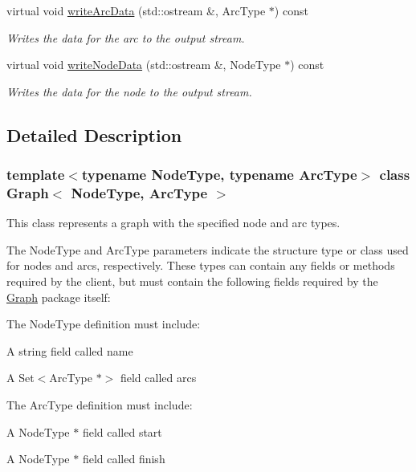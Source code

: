 \begin{DoxyCompactItemize}
virtual void \mbox{\hyperlink{classGraph_ac9ab61a83ff4792f63e9e110b534cdfd}{write\+Arc\+Data}} (std\+::ostream \&, Arc\+Type $\ast$) const
\begin{DoxyCompactList}\small\item\em Writes the data for the arc to the output stream. \end{DoxyCompactList}\item 
virtual void \mbox{\hyperlink{classGraph_ac0db5231476c8cb10655d58ebc108b78}{write\+Node\+Data}} (std\+::ostream \&, Node\+Type $\ast$) const
\begin{DoxyCompactList}\small\item\em Writes the data for the node to the output stream. \end{DoxyCompactList}\end{DoxyCompactItemize}


\subsection{Detailed Description}
\subsubsection*{template$<$typename Node\+Type, typename Arc\+Type$>$\newline
class Graph$<$ Node\+Type, Arc\+Type $>$}

This class represents a graph with the specified node and arc types. 

The {\ttfamily Node\+Type} and {\ttfamily Arc\+Type} parameters indicate the structure type or class used for nodes and arcs, respectively. These types can contain any fields or methods required by the client, but must contain the following fields required by the {\ttfamily \mbox{\hyperlink{classGraph}{Graph}}} package itself\+:

The {\ttfamily Node\+Type} definition must include\+: 
\begin{DoxyItemize}
\item A {\ttfamily string} field called {\ttfamily name} 
\item A {\ttfamily Set$<$Arc\+Type $\ast$$>$} field called {\ttfamily arcs} 
\end{DoxyItemize}

The {\ttfamily Arc\+Type} definition must include\+: 
\begin{DoxyItemize}
\item A {\ttfamily Node\+Type $\ast$} field called {\ttfamily start} 
\item A {\ttfamily Node\+Type $\ast$} field called {\ttfamily finish} 
\end{DoxyItemize}

